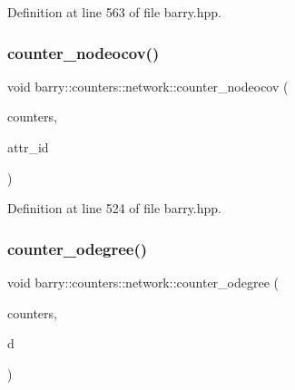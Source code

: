 Definition at line 563 of file barry.\+hpp.

\mbox{\label{namespacebarry_1_1counters_1_1network_a61b287d49772a5bfa3d11d42f70ec1d8}} 
\subsubsection{\texorpdfstring{counter\+\_\+nodeocov()}{counter\_nodeocov()}}
{\footnotesize\ttfamily void barry\+::counters\+::network\+::counter\+\_\+nodeocov (\begin{DoxyParamCaption}\item[{\hyperlink{namespacebarry_1_1counters_1_1network_aa72fdb34752ac24167a06ee196a8fff6}{Net\+Counters} $\ast$}]{counters,  }\item[{\hyperlink{namespacebarry_a11dfc53ddb4672278319aa04f1e09a6c}{uint}}]{attr\+\_\+id }\end{DoxyParamCaption})\hspace{0.3cm}{\ttfamily [inline]}}



Definition at line 524 of file barry.\+hpp.

\mbox{\label{namespacebarry_1_1counters_1_1network_adb3a690ba6de839767b66f8bda088e2e}} 
\subsubsection{\texorpdfstring{counter\+\_\+odegree()}{counter\_odegree()}}
{\footnotesize\ttfamily void barry\+::counters\+::network\+::counter\+\_\+odegree (\begin{DoxyParamCaption}\item[{\hyperlink{namespacebarry_1_1counters_1_1network_aa72fdb34752ac24167a06ee196a8fff6}{Net\+Counters} $\ast$}]{counters,  }\item[{std\+::vector$<$ \hyperlink{namespacebarry_a11dfc53ddb4672278319aa04f1e09a6c}{uint} $>$}]{d }\end{DoxyParamCaption})\hspace{0.3cm}{\ttfamily [inline]}}



